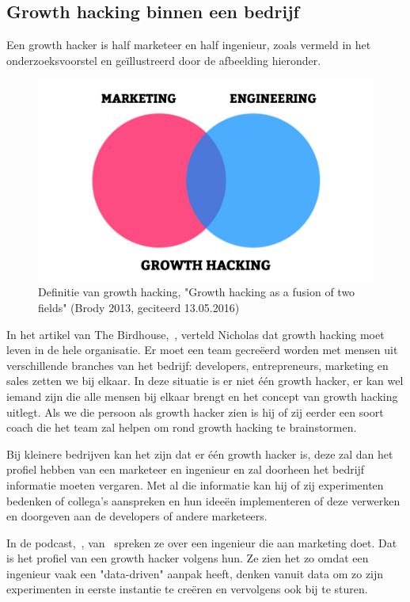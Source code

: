 \subsection{Growth hacking binnen een bedrijf}
\label{sec:growth-hacker-functie}
Een growth hacker is half marketeer en half ingenieur, zoals vermeld in het onderzoeksvoorstel en geïllustreerd door de afbeelding hieronder.
\begin{figure}[h!]
	\includegraphics[width=\linewidth]{img/growth-hacker-definition.jpg}
	\centering
	\caption{Definitie van growth hacking, "Growth hacking as a fusion of two fields"  (Brody 2013, geciteerd 13.05.2016)}
	\label{fig:defGrowthHacker}
\end{figure}
In het artikel van The Birdhouse,~, verteld Nicholas dat growth hacking moet leven in de hele organisatie. Er moet een team gecreëerd worden met mensen uit verschillende branches van het bedrijf: developers, entrepreneurs, marketing en sales zetten we bij elkaar. In deze situatie is er niet één growth hacker, er kan wel iemand zijn die alle mensen bij elkaar brengt en het concept van growth hacking uitlegt. Als we die persoon als growth hacker zien is hij of zij eerder een soort coach die het team zal helpen om rond growth hacking te brainstormen.

Bij kleinere bedrijven kan het zijn dat er één growth hacker is, deze zal dan het profiel hebben van een marketeer en ingenieur en zal doorheen het bedrijf informatie moeten vergaren. Met al die informatie kan hij of zij experimenten bedenken of collega's aanspreken en hun ideeën implementeren of deze verwerken en doorgeven aan de developers of andere marketeers. 

In de podcast,~, van~\autocite{fizzle.co2015} spreken ze over een ingenieur die aan marketing doet. Dat is het profiel van een growth hacker volgens hun. Ze zien het zo omdat een ingenieur vaak een "data-driven" aanpak heeft, denken vanuit data om zo zijn experimenten in eerste instantie te creëren en vervolgens ook bij te sturen. 

